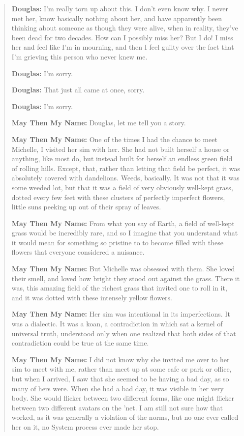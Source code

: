 \begin{quote}
\textbf{Douglas:} I'm really torn up about this. I don't even know why. I never met her, know basically nothing about her, and have apparently been thinking about someone as though they were alive, when in reality, they've been dead for two decades. How can I possibly miss her? But I do! I miss her and feel like I'm in mourning, and then I feel guilty over the fact that I'm grieving this person who never knew me.

\textbf{Douglas:} I'm sorry.

\textbf{Douglas:} That just all came at once, sorry.

\textbf{Douglas:} I'm sorry.

\textbf{May Then My Name:} Douglas, let me tell you a story.

\textbf{May Then My Name:} One of the times I had the chance to meet Michelle, I visited her sim with her. She had not built herself a house or anything, like most do, but instead built for herself an endless green field of rolling hills. Except, that, rather than letting that field be perfect, it was absolutely covered with dandelions. Weeds, basically. It was not that it was some weeded lot, but that it was a field of very obviously well-kept grass, dotted every few feet with these clusters of perfectly imperfect flowers, little suns peeking up out of their spray of leaves.

\textbf{May Then My Name:} From what you say of Earth, a field of well-kept grass would be incredibly rare, and so I imagine that you understand what it would mean for something so pristine to to become filled with these flowers that everyone considered a nuisance.

\textbf{May Then My Name:} But Michelle was obsessed with them. She loved their smell, and loved how bright they stood out against the grass. There it was, this amazing field of the richest grass that invited one to roll in it, and it was dotted with these intensely yellow flowers.

\textbf{May Then My Name:} Her sim was intentional in its imperfections. It was a dialectic. It was a koan, a contradiction in which sat a kernel of universal truth, understood only when one realized that both sides of that contradiction could be true at the same time.

\textbf{May Then My Name:} I did not know why she invited me over to her sim to meet with me, rather than meet up at some cafe or park or office, but when I arrived, I saw that she seemed to be having a bad day, as so many of hers were. When she had a bad day, it was visible in her very body. She would flicker between two different forms, like one might flicker between two different avatars on the 'net. I am still not sure how that worked, as it was generally a violation of the norms, but no one ever called her on it, no System process ever made her stop.


\end{quote}
